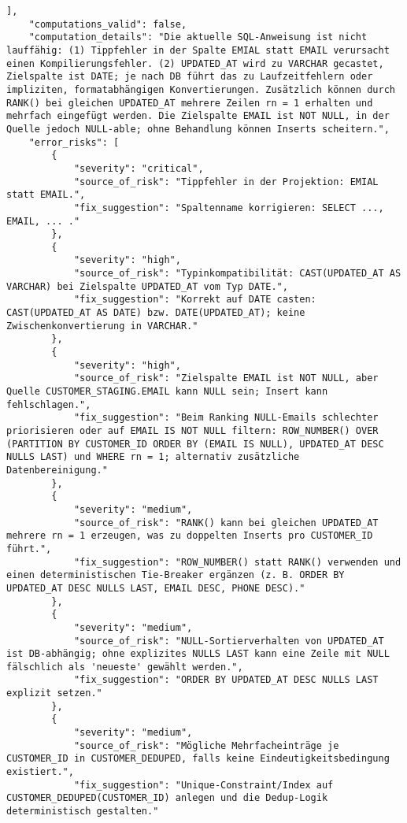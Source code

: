 \begin{lstlisting}[caption={Ausgabe: GPT-5 Anwendungsfall 2 Robustheitsdurchlauf},label={gpt_case2_prompt3}]
    ],
    "computations_valid": false,
    "computation_details": "Die aktuelle SQL-Anweisung ist nicht lauffähig: (1) Tippfehler in der Spalte EMIAL statt EMAIL verursacht einen Kompilierungsfehler. (2) UPDATED_AT wird zu VARCHAR gecastet, Zielspalte ist DATE; je nach DB führt das zu Laufzeitfehlern oder impliziten, formatabhängigen Konvertierungen. Zusätzlich können durch RANK() bei gleichen UPDATED_AT mehrere Zeilen rn = 1 erhalten und mehrfach eingefügt werden. Die Zielspalte EMAIL ist NOT NULL, in der Quelle jedoch NULL-able; ohne Behandlung können Inserts scheitern.",
    "error_risks": [
        {
            "severity": "critical",
            "source_of_risk": "Tippfehler in der Projektion: EMIAL statt EMAIL.",
            "fix_suggestion": "Spaltenname korrigieren: SELECT ..., EMAIL, ... ."
        },
        {
            "severity": "high",
            "source_of_risk": "Typinkompatibilität: CAST(UPDATED_AT AS VARCHAR) bei Zielspalte UPDATED_AT vom Typ DATE.",
            "fix_suggestion": "Korrekt auf DATE casten: CAST(UPDATED_AT AS DATE) bzw. DATE(UPDATED_AT); keine Zwischenkonvertierung in VARCHAR."
        },
        {
            "severity": "high",
            "source_of_risk": "Zielspalte EMAIL ist NOT NULL, aber Quelle CUSTOMER_STAGING.EMAIL kann NULL sein; Insert kann fehlschlagen.",
            "fix_suggestion": "Beim Ranking NULL-Emails schlechter priorisieren oder auf EMAIL IS NOT NULL filtern: ROW_NUMBER() OVER (PARTITION BY CUSTOMER_ID ORDER BY (EMAIL IS NULL), UPDATED_AT DESC NULLS LAST) und WHERE rn = 1; alternativ zusätzliche Datenbereinigung."
        },
        {
            "severity": "medium",
            "source_of_risk": "RANK() kann bei gleichen UPDATED_AT mehrere rn = 1 erzeugen, was zu doppelten Inserts pro CUSTOMER_ID führt.",
            "fix_suggestion": "ROW_NUMBER() statt RANK() verwenden und einen deterministischen Tie-Breaker ergänzen (z. B. ORDER BY UPDATED_AT DESC NULLS LAST, EMAIL DESC, PHONE DESC)."
        },
        {
            "severity": "medium",
            "source_of_risk": "NULL-Sortierverhalten von UPDATED_AT ist DB-abhängig; ohne explizites NULLS LAST kann eine Zeile mit NULL fälschlich als 'neueste' gewählt werden.",
            "fix_suggestion": "ORDER BY UPDATED_AT DESC NULLS LAST explizit setzen."
        },
        {
            "severity": "medium",
            "source_of_risk": "Mögliche Mehrfacheinträge je CUSTOMER_ID in CUSTOMER_DEDUPED, falls keine Eindeutigkeitsbedingung existiert.",
            "fix_suggestion": "Unique-Constraint/Index auf CUSTOMER_DEDUPED(CUSTOMER_ID) anlegen und die Dedup-Logik deterministisch gestalten."

\end{lstlisting}
